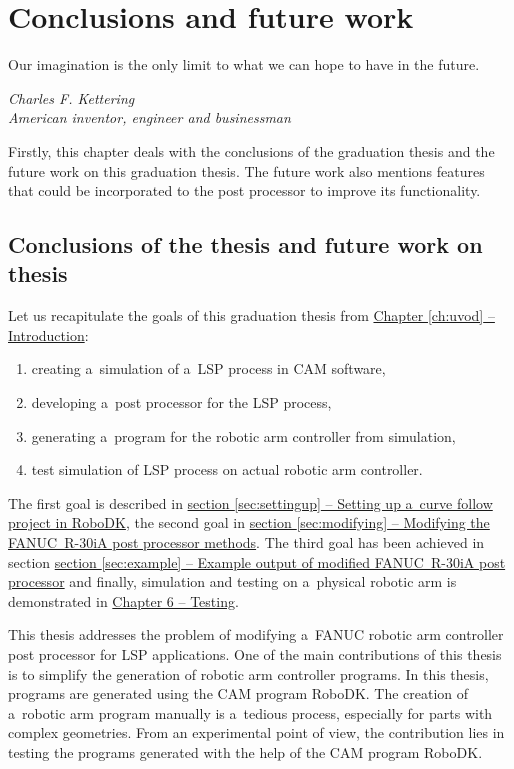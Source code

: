 ﻿\chapter{Conclusions and future work \label{chap:discussion}}

\epigraph{Our imagination is the only limit to what we can hope to have in the future.}{\textit{Charles F. Kettering \\ American inventor, engineer and businessman }}

Firstly, this chapter deals with the conclusions of the graduation thesis and the future work on this graduation thesis. The future work also mentions features that could be incorporated to the post processor to improve its functionality. 

\section{Conclusions of the thesis and future work on thesis}

Let us recapitulate the goals of this graduation thesis from \hyperref[ch:uvod]{Chapter \ref{ch:uvod} -- Introduction}:

\begin{enumerate}

    \item creating a~simulation of a~LSP process in CAM software,
    \item developing a~post processor for the LSP process, 
    \item generating a~program  for the robotic arm controller from simulation,
    \item test simulation of LSP process on actual robotic arm controller.
    
\end{enumerate}


The first goal is described in \hyperref[sec:settingup]{section \ref{sec:settingup} -- Setting up a~curve follow project in RoboDK}, the second goal in \hyperref[sec:modifying]{section \ref{sec:modifying} -- Modifying the FANUC~R-30iA post processor methods}. The third goal has been achieved in section  \hyperref[sec:example]{section \ref{sec:example} -- Example output of modified FANUC~R-30iA post processor} and finally, simulation and testing on a~physical robotic arm is demonstrated in \hyperref[chap:testing]{Chapter 6 -- Testing}.

This thesis addresses the problem of modifying a~FANUC robotic arm controller post processor for LSP applications. One of the main contributions of this thesis is to simplify the generation of robotic arm controller programs. In this thesis, programs are generated using the CAM  program RoboDK. The creation of a~robotic arm program manually is a~tedious process, especially for parts with complex geometries. From an experimental point of view, the contribution lies in testing the programs generated with the help of the CAM program RoboDK.

